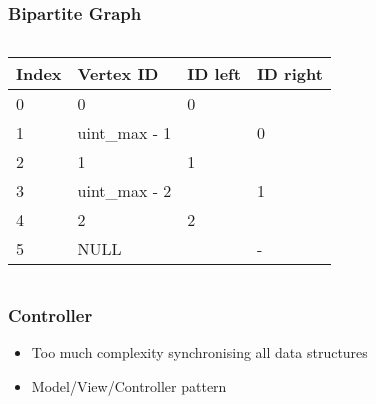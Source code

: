 \documentclass{beamer}[12pt]
\begin{document}
	\begin{frame}
		\frametitle{Bipartite Graph}
		\begin{columns}[c]
			\hspace{4mm}
			\begin{tabular}{|l|l|l|l|}\hline
				Index & Vertex ID & ID left & ID right \\ \hline \hline
				0 & 0 & 0 & \\ \hline
				1 & uint\_max - 1 & & 0 \\ \hline
				2 & 1 & 1 & \\ \hline
				3 & uint\_max - 2 & & 1 \\ \hline
				4 & 2 & 2 & \\ \hline
				5 & NULL & & - \\ \hline
			\end{tabular}
			
		\end{columns}
	\end{frame}

	\begin{frame}
	\frametitle{Controller}
	\begin{itemize}[label={-}]
		\item Too much complexity synchronising all data structures
		\item Model/View/Controller pattern
	\end{itemize}
\end{frame}
\end{document}
